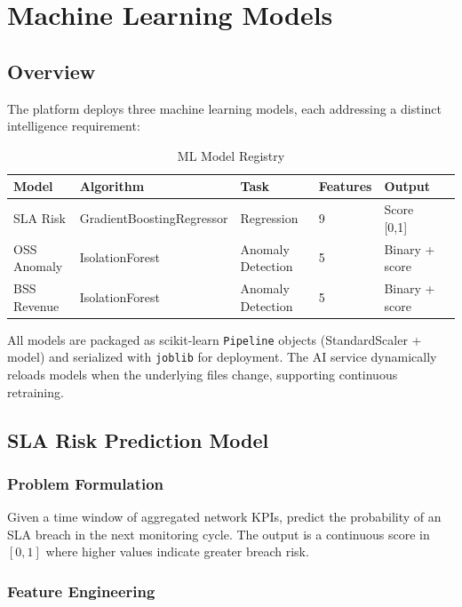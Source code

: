 \chapter{Machine Learning Models}
\label{ch:ml-models}

\section{Overview}

The platform deploys three machine learning models, each addressing a distinct intelligence requirement:

\begin{table}[H]
\centering
\caption{ML Model Registry}
\label{tab:model-registry}
\begin{tabular}{@{}llllll@{}}
\toprule
\textbf{Model} & \textbf{Algorithm} & \textbf{Task} & \textbf{Features} & \textbf{Output} \\
\midrule
SLA Risk & GradientBoostingRegressor & Regression & 9 & Score [0,1] \\
OSS Anomaly & IsolationForest & Anomaly Detection & 5 & Binary + score \\
BSS Revenue & IsolationForest & Anomaly Detection & 5 & Binary + score \\
\bottomrule
\end{tabular}
\end{table}

All models are packaged as scikit-learn \texttt{Pipeline} objects (StandardScaler + model) and serialized with \texttt{joblib} for deployment. The AI service dynamically reloads models when the underlying files change, supporting continuous retraining.

\section{SLA Risk Prediction Model}

\subsection{Problem Formulation}

Given a time window of aggregated network KPIs, predict the probability of an SLA breach in the next monitoring cycle. The output is a continuous score in $[0, 1]$ where higher values indicate greater breach risk.

\subsection{Feature Engineering}

